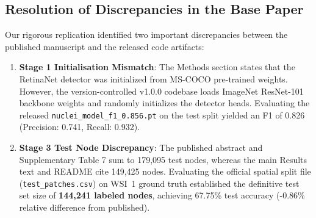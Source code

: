 \documentclass[a4paper,fleqn]{cas-sc}
\begin{document}
\subsection{Resolution of Discrepancies in the Base Paper}
Our rigorous replication identified two important discrepancies between the published manuscript and the released code artifacts:
\begin{enumerate}
    \item \textbf{Stage 1 Initialisation Mismatch}: The Methods section states that the RetinaNet detector was initialized from MS-COCO pre-trained weights. However, the version-controlled v1.0.0 codebase loads ImageNet ResNet-101 backbone weights and randomly initializes the detector heads. Evaluating the released \texttt{nuclei\_model\_f1\_0.856.pt} on the test split yielded an F1 of 0.826 (Precision: 0.741, Recall: 0.932).
    \item \textbf{Stage 3 Test Node Discrepancy}: The published abstract and Supplementary Table 7 sum to 179,095 test nodes, whereas the main Results text and README cite 149,425 nodes. Evaluating the official spatial split file (\texttt{test\_patches.csv}) on WSI~1 ground truth established the definitive test set size of \textbf{144,241 labeled nodes}, achieving 67.75\% test accuracy (-0.86\% relative difference from published).
\end{enumerate}
\end{document}
